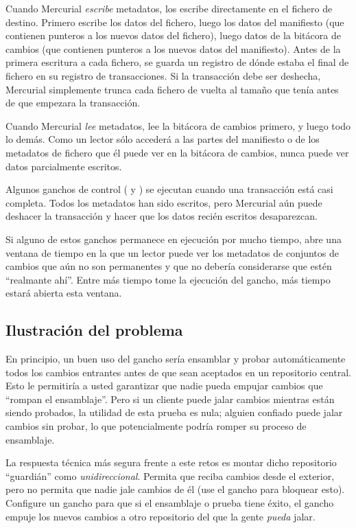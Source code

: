 Cuando Mercurial \emph{escribe} metadatos, los escribe directamente en
el fichero de destino. Primero escribe los datos del fichero, luego
los datos del manifiesto (que contienen punteros a los nuevos datos
del fichero), luego datos de la bitácora de cambios (que contienen
punteros a los nuevos datos del manifiesto). Antes de la primera
escritura a cada fichero, se guarda un registro de dónde estaba el
final de fichero en su registro de transacciones. Si la transacción
debe ser deshecha, Mercurial simplemente trunca cada fichero de vuelta
al tamaño que tenía antes de que empezara la transacción.

Cuando Mercurial \emph{lee} metadatos, lee la bitácora de cambios
primero, y luego todo lo demás. Como un lector sólo accederá a las
partes del manifiesto o de los metadatos de fichero que él puede ver
en la bitácora de cambios, nunca puede ver datos parcialmente
escritos.

Algunos ganchos de control ( y
) se ejecutan cuando una transacción está casi
completa. Todos los metadatos han sido escritos, pero Mercurial aún
puede deshacer la transacción y hacer que los datos recién escritos
desaparezcan.

Si alguno de estos ganchos permanece en ejecución por mucho tiempo,
abre una ventana de tiempo en la que un lector puede ver los metadatos
de conjuntos de cambios que aún no son permanentes y que no debería
considerarse que estén ``realmante ahí''. Entre más tiempo tome la
ejecución del gancho, más tiempo estará abierta esta ventana.

\subsection{Ilustración del problema}

En principio, un buen uso del gancho  sería
ensamblar y probar automáticamente todos los cambios entrantes antes
de que sean aceptados en un repositorio central. Esto le permitiría a
usted garantizar que nadie pueda empujar cambios que ``rompan el
ensamblaje''. Pero si un cliente puede jalar cambios mientras están
siendo probados, la utilidad de esta prueba es nula; alguien confiado
puede jalar cambios sin probar, lo que potencialmente podría romper su
proceso de ensamblaje.

La respuesta técnica más segura frente a este retos es montar dicho
repositorio ``guardián'' como \emph{unidireccional}. Permita que
reciba cambios desde el exterior, pero no permita que nadie jale
cambios de él (use el gancho  para bloquear esto).
Configure un gancho  para que si el ensamblaje o
prueba tiene éxito, el gancho empuje los nuevos cambios a otro
repositorio del que la gente \emph{pueda} jalar.

